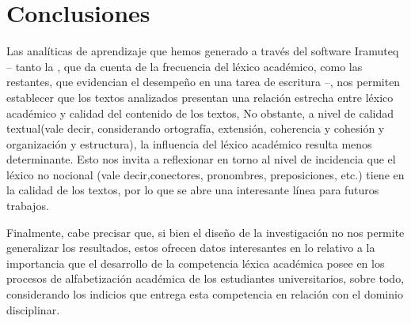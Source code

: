 \documentclass{textolivre}
\begin{document}
\section{Conclusiones}\label{sec-conclusiones}
Las analíticas de aprendizaje que hemos generado a través del software
Iramuteq – tanto la , que da cuenta de la frecuencia del léxico
académico, como las restantes, que evidencian el desempeño en una tarea de
escritura –, nos permiten establecer que los textos analizados presentan una
relación estrecha entre léxico académico y calidad del contenido de los textos,
No obstante, a nivel de calidad textual(vale decir, considerando ortografía,
extensión, coherencia y cohesión y organización y estructura), la influencia del
léxico académico resulta menos determinante. Esto nos invita a reflexionar en
torno al nivel de incidencia que el léxico no nocional (vale decir,conectores,
pronombres, preposiciones, etc.) tiene en la calidad de los textos, por lo
que se abre una interesante línea para futuros trabajos.

Finalmente, cabe precisar que, si bien el diseño de la investigación no nos
permite generalizar los resultados, estos ofrecen datos interesantes en lo
relativo a la importancia que el desarrollo de la competencia léxica académica
posee en los procesos de alfabetización académica de los estudiantes
universitarios, sobre todo, considerando los indicios que entrega esta
competencia en relación con el dominio disciplinar.


\printbibliography\label{sec-bib}
\end{document}
